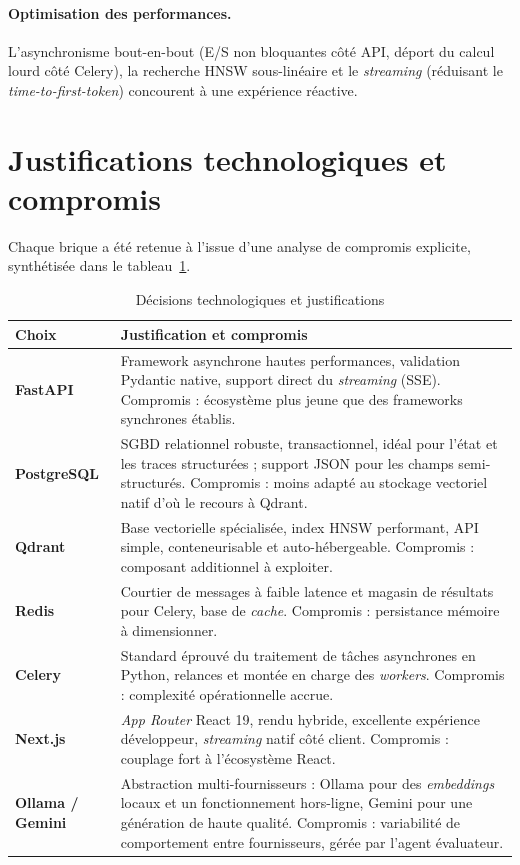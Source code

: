 \documentclass[12pt,a4paper,oneside]{report}
\begin{document}
\paragraph{Optimisation des performances.} L'asynchronisme bout-en-bout (E/S non
bloquantes côté API, déport du calcul lourd côté Celery), la recherche HNSW
sous-linéaire et le \emph{streaming} (réduisant le \emph{time-to-first-token})
concourent à une expérience réactive.

\section{Justifications technologiques et compromis}
Chaque brique a été retenue à l'issue d'une analyse de compromis explicite,
synthétisée dans le tableau~\ref{tab:choix}.

\begin{table}[H]
\centering
\caption{Décisions technologiques et justifications}
\label{tab:choix}
\small
\begin{tabularx}{\textwidth}{@{}>{\bfseries}l X@{}}
\toprule
Choix & Justification et compromis \\
\midrule
FastAPI &
Framework asynchrone hautes performances, validation Pydantic native, support
direct du \emph{streaming} (SSE). Compromis : écosystème plus jeune que des
frameworks synchrones établis. \\
PostgreSQL &
SGBD relationnel robuste, transactionnel, idéal pour l'état et les traces
structurées ; support JSON pour les champs semi-structurés. Compromis : moins
adapté au stockage vectoriel natif d'où le recours à Qdrant. \\
Qdrant &
Base vectorielle spécialisée, index HNSW performant, API simple, conteneurisable
et auto-hébergeable. Compromis : composant additionnel à exploiter. \\
Redis &
Courtier de messages à faible latence et magasin de résultats pour Celery, base
de \emph{cache}. Compromis : persistance mémoire à dimensionner. \\
Celery &
Standard éprouvé du traitement de tâches asynchrones en Python, relances et
montée en charge des \emph{workers}. Compromis : complexité opérationnelle accrue. \\
Next.js &
\emph{App Router} React 19, rendu hybride, excellente expérience développeur,
\emph{streaming} natif côté client. Compromis : couplage fort à l'écosystème React. \\
Ollama / Gemini &
Abstraction multi-fournisseurs : Ollama pour des \emph{embeddings} locaux et un
fonctionnement hors-ligne, Gemini pour une génération de haute qualité.
Compromis : variabilité de comportement entre fournisseurs, gérée par l'agent
évaluateur. \\
\bottomrule
\end{tabularx}
\end{table}
\end{document}
